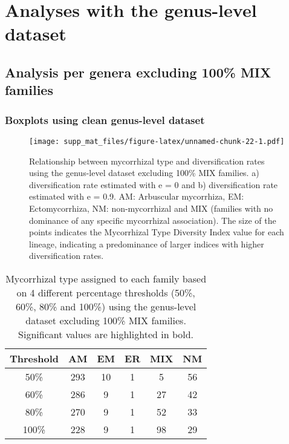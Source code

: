 \documentclass[]{article}
\begin{document}
\hypertarget{analyses-with-the-genus-level-dataset}{%
\section{Analyses with the genus-level
dataset}\label{analyses-with-the-genus-level-dataset}}

\hypertarget{analysis-per-genera-excluding-100-mix-families}{%
\subsection{Analysis per genera excluding 100\% MIX
families}\label{analysis-per-genera-excluding-100-mix-families}}

\hypertarget{boxplots-using-clean-genus-level-dataset}{%
\subsubsection{Boxplots using clean genus-level
dataset}\label{boxplots-using-clean-genus-level-dataset}}

\begin{figure}
\centering
\texttt{[image: supp\_mat\_files/figure-latex/unnamed-chunk-22-1.pdf]}
\caption{Relationship between mycorrhizal type and diversification rates
using the genus-level dataset excluding 100\% MIX families. a)
diversification rate estimated with e = 0 and b) diversification rate
estimated with e = 0.9. AM: Arbuscular mycorrhiza, EM: Ectomycorrhiza,
NM: non-mycorrhizal and MIX (families with no dominance of any specific
mycorrhizal association). The size of the points indicates the
Mycorrhizal Type Diversity Index value for each lineage, indicating a
predominance of larger indices with higher diversification rates.}
\end{figure}

\begin{table}[H]

\caption{\label{tab:unnamed-chunk-23}Mycorrhizal type assigned to each family based on 4 different percentage thresholds (50\%, 60\%, 80\% and 100\%) using the genus-level dataset excluding 100\% MIX families. Significant values are highlighted in bold.}
\centering
\begin{tabular}{c|c|c|c|c|c}
\hline
Threshold & AM & EM & ER & MIX & NM\\
\hline
50\% & 293 & 10 & 1 & 5 & 56\\
\hline
60\% & 286 & 9 & 1 & 27 & 42\\
\hline
80\% & 270 & 9 & 1 & 52 & 33\\
\hline
100\% & 228 & 9 & 1 & 98 & 29\\
\hline
\end{tabular}
\end{table}
\end{document}
